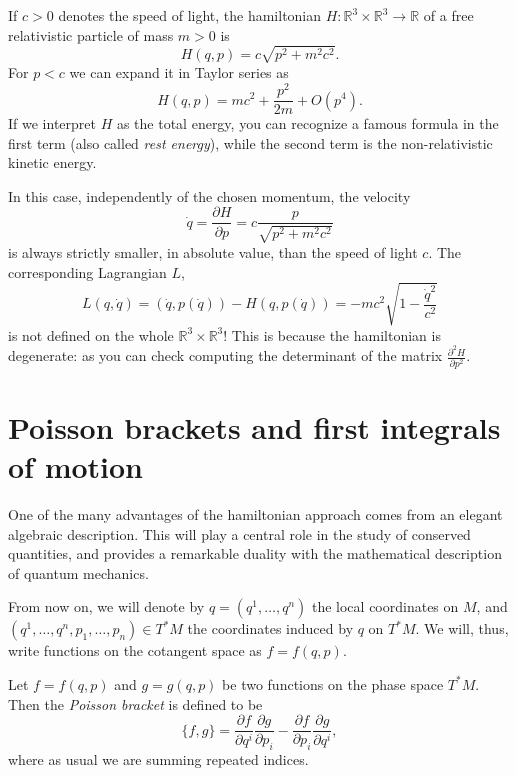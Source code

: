 \documentclass[english,fontsize=11pt,paper=a5,oneside]{scrbook}
\newcommand{\R}{\mathbb{R}}
\theoremstyle{definition}
\newenvironment{example}
  {\pushQED{\qed}\renewcommand{\qedsymbol}{$\lozenge$}\examplex}
  {\popQED\endexamplex}
\begin{document}
\begin{example}[The relativistic hamiltonian]
    If $c>0$ denotes the speed of light, the hamiltonian $H:\R^3\times\R^3\to\R$ of a free relativistic particle of mass $m>0$ is
    \begin{equation}
        H(q,p) = c \sqrt{p^2 + m^2 c^2}.
    \end{equation}
    For $p < c$ we can expand it in Taylor series as
    \begin{equation}
       H(q,p) = mc^2 + \frac{p^2}{2m} + O(p^4).
    \end{equation}
    If we interpret $H$ as the total energy, you can recognize a famous formula in the first term (also called \emph{rest energy}), while the second term is the non-relativistic kinetic energy.

    In this case, independently of the chosen momentum, the velocity
    \begin{equation}
        \dot q = \frac{\partial H}{\partial p} = c \frac{p}{\sqrt{p^2 + m^2 c^2}}
    \end{equation}
    is always strictly smaller, in absolute value, than the speed of light $c$.
    The corresponding Lagrangian $L$,
    \begin{equation}
        L(q,\dot q) = (\dot q, p(\dot q)) - H(q, p(\dot q)) = -mc^2 \sqrt{1-\frac{\dot q^2}{c^2}}
    \end{equation}
    is not defined on the whole $\R^3\times\R^3$! This is because the hamiltonian is degenerate: as you can check computing the determinant of the matrix $\frac{\partial^2 H}{\partial p^2}$.
\end{example}

\section{Poisson brackets and first integrals of motion}\label{sec:poisson}

One of the many advantages of the hamiltonian approach comes from an elegant algebraic description.
This will play a central role in the study of conserved quantities, and provides a remarkable duality with the mathematical description of quantum mechanics.

From now on, we will denote by $q = (q^1, \ldots, q^n)$ the local coordinates on $M$, and $(q^1, \ldots, q^n, p_1, \ldots, p_n)\in T^*M$ the coordinates induced by $q$ on $T^*M$. We will, thus, write functions on the cotangent space as $f=f(q,p)$.

\begin{tcolorbox}
    Let $f=f(q,p)$ and $g=g(q,p)$ be two functions on the phase space $T^*M$.
    Then the \emph{Poisson bracket} is defined to be
    \begin{equation}\label{def:Poisson}
        \big\{f,g\big\} = \frac{\partial f}{\partial q^i}\frac{\partial g}{\partial p_i} - \frac{\partial f}{\partial p_i}\frac{\partial g}{\partial q^i},
    \end{equation}
    where as usual we are summing repeated indices.
\end{tcolorbox}
\end{document}
